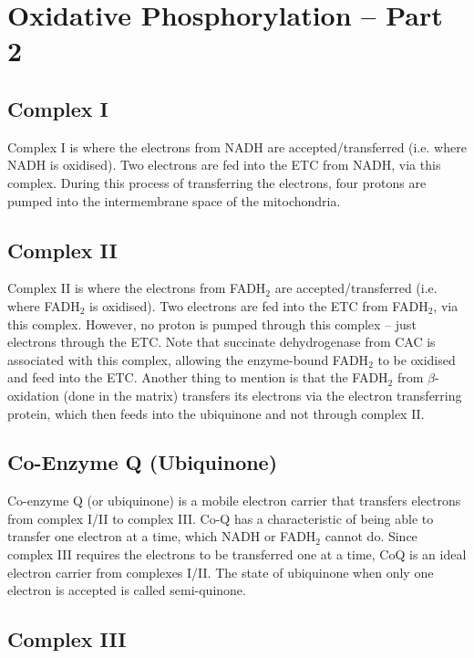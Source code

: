 \section{Oxidative Phosphorylation -- Part 2}

\subsection{Complex I}

Complex I is where the electrons from NADH are accepted/transferred (i.e. where NADH is oxidised).
Two electrons are fed into the ETC from NADH, via this complex.
During this process of transferring the electrons, four protons are pumped into the intermembrane space of the mitochondria.

\subsection{Complex II}

Complex II is where the electrons from FADH$_2$ are accepted/transferred (i.e. where FADH$_2$ is oxidised).
Two electrons are fed into the ETC from FADH$_2$, via this complex.
However, no proton is pumped through this complex -- just electrons through the ETC.
Note that succinate dehydrogenase from CAC is associated with this complex, allowing the enzyme-bound FADH$_2$ to be oxidised and feed into the ETC.
Another thing to mention is that the FADH$_2$ from $\beta$-oxidation (done in the matrix) transfers its electrons via the electron transferring protein, which then feeds into the ubiquinone and not through complex II.

\subsection{Co-Enzyme Q (Ubiquinone)}

Co-enzyme Q (or ubiquinone) is a mobile electron carrier that transfers electrons from complex I/II to complex III.
Co-Q has a characteristic of being able to transfer one electron at a time, which NADH or FADH$_2$ cannot do.
Since complex III requires the electrons to be transferred one at a time, CoQ is an ideal electron carrier from complexes I/II.
The state of ubiquinone when only one electron is accepted is called semi-quinone.

\subsection{Complex III}


